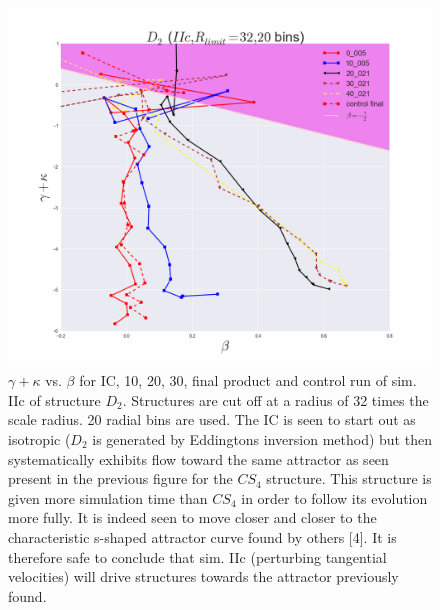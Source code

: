 \begin{figure}[!htbp]
\centering
\includegraphics[width=1.0\linewidth]{img/beta_vs_gamma_plus_kappa_IIc_D2_Rlimit32.png}
\caption{$\gamma + \kappa$ vs. $\beta$ for IC, 10, 20, 30, final product and control run of sim. IIc of structure $D_2$. Structures are cut off at a radius of 32 times the scale radius. 20 radial bins are used.
The IC is seen to start out as isotropic ($D_2$ is generated by Eddingtons inversion method) but then systematically exhibits flow toward the same attractor as seen present in the previous figure for the $CS_4$ structure. This structure is given more simulation time than $CS_4$ in order to follow its evolution more fully. It is indeed seen to move closer and closer to the characteristic s-shaped attractor curve found by others [4]. It is therefore safe to conclude that sim. IIc (perturbing tangential velocities) will drive structures towards the attractor previously found.}
\label{fig:test}
\end{figure}

